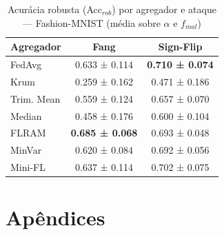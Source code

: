 \begin{table}[H]
\centering
\caption{Acurácia robusta (Acc$_{rob}$) por agregador e ataque — Fashion-MNIST (média sobre $\alpha$ e $f_{mal}$)}
\label{tab:robust_acc_fashion}
\footnotesize
\setlength{\tabcolsep}{3pt}
\begin{tabular}{@{}lcc@{}}
\toprule
\textbf{Agregador} & \textbf{Fang} & \textbf{Sign-Flip} \\
\midrule
FedAvg & 0.633 ± 0.114 & \textbf{0.710 ± 0.074} \\
Krum & 0.259 ± 0.162 & 0.471 ± 0.186 \\
Trim. Mean & 0.559 ± 0.124 & 0.657 ± 0.070 \\
Median & 0.458 ± 0.176 & 0.600 ± 0.104 \\
FLRAM & \textbf{0.685 ± 0.068} & 0.693 ± 0.048 \\
MinVar & 0.620 ± 0.084 & 0.692 ± 0.056 \\
Mini-FL & 0.637 ± 0.114 & 0.702 ± 0.075 \\
\bottomrule
\end{tabular}
\end{table}

\chapter*{Apêndices}


